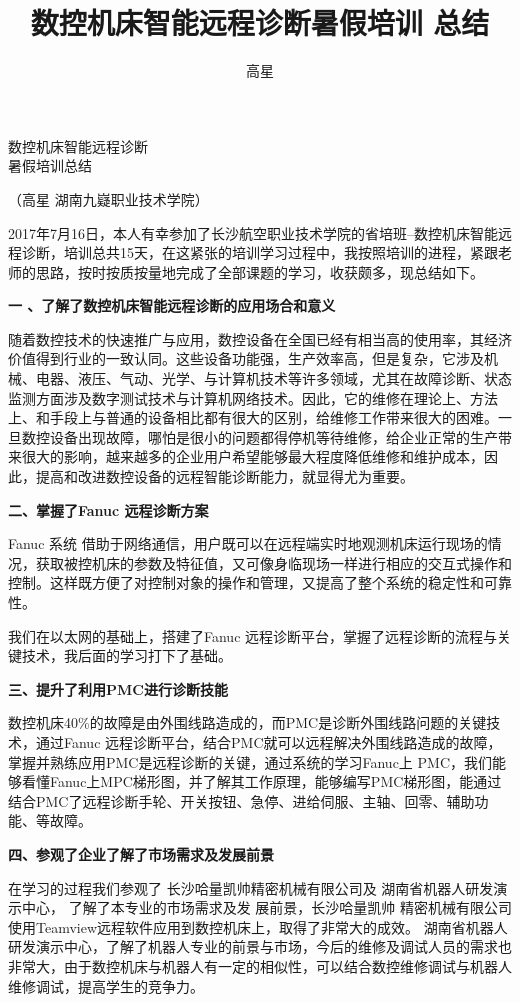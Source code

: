 \documentclass[12pt,a4paper]{ctexart}
\title{数控机床智能远程诊断暑假培训 总结}
\author{高星}
\date{}
\begin{document}
	\begin{center}
	\heiti {}	数控机床智能远程诊断\\暑假培训总结
	
	\songti {} （高星 \hspace{1cm} 湖南九嶷职业技术学院）
	\end{center}
\indent

2017年7月16日，本人有幸参加了长沙航空职业技术学院的省培班--数控机床智能远程诊断，培训总共15天，在这紧张的培训学习过程中，我按照培训的进程，紧跟老师的思路，按时按质按量地完成了全部课题的学习，收获颇多，现总结如下。

\textbf{一 、了解了数控机床智能远程诊断的应用场合和意义}

随着数控技术的快速推广与应用，数控设备在全国已经有相当高的使用率，其经济价值得到行业的一致认同。这些设备功能强，生产效率高，但是复杂，它涉及机械、电器、液压、气动、光学、与计算机技术等许多领域，尤其在故障诊断、状态监测方面涉及数字测试技术与计算机网络技术。因此，它的维修在理论上、方法上、和手段上与普通的设备相比都有很大的区别，给维修工作带来很大的困难。一旦数控设备出现故障，哪怕是很小的问题都得停机等待维修，给企业正常的生产带来很大的影响，越来越多的企业用户希望能够最大程度降低维修和维护成本，因此，提高和改进数控设备的远程智能诊断能力，就显得尤为重要。

\textbf{二、掌握了Fanuc 远程诊断方案}

Fanuc 系统 借助于网络通信，用户既可以在远程端实时地观测机床运行现场的情况，获取被控机床的参数及特征值，又可像身临现场一样进行相应的交互式操作和控制。这样既方便了对控制对象的操作和管理，又提高了整个系统的稳定性和可靠性。

我们在以太网的基础上，搭建了Fanuc 远程诊断平台，掌握了远程诊断的流程与关键技术，我后面的学习打下了基础。

\textbf{三、提升了利用PMC进行诊断技能}

数控机床40\%的故障是由外围线路造成的，而PMC是诊断外围线路问题的关键技术，通过Fanuc 远程诊断平台，结合PMC就可以远程解决外围线路造成的故障，掌握并熟练应用PMC是远程诊断的关键，通过系统的学习Fanuc上 PMC，我们能够看懂Fanuc上MPC梯形图，并了解其工作原理，能够编写PMC梯形图，能通过结合PMC了远程诊断手轮、开关按钮、急停、进给伺服、主轴、回零、辅助功能、等故障。

\textbf{四、参观了企业了解了市场需求及发展前景}

在学习的过程我们参观了
长沙哈量凯帅精密机械有限公司及
湖南省机器人研发演示中心，
了解了本专业的市场需求及发             展前景，长沙哈量凯帅   精密机械有限公司使用Teamview远程软件应用到数控机床上，取得了非常大的成效。
湖南省机器人研发演示中心，了解了机器人专业的前景与市场，今后的维修及调试人员的需求也非常大，由于数控机床与机器人有一定的相似性，可以结合数控维修调试与机器人维修调试，提高学生的竞争力。
	
\end{document}
